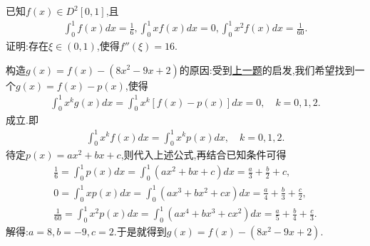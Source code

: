 \documentclass[lang=cn,newtx,10pt,scheme=chinese]{elegantbook}
\begin{document}
\begin{example}
   已知$f(x)\in D^2[0,1]$,且
   \begin{align*}
      \int_0^1{f\left( x \right) dx}=\frac{1}{6},\int_0^1{xf\left( x \right) dx}=0,\int_0^1{x^2f\left( x \right) dx}=\frac{1}{60}.
   \end{align*}
证明:存在$\xi \in (0,1)$,使得$f''(\xi)=16$.
\end{example}
\begin{note}
构造$g(x)=f(x)-(8x^2 - 9x + 2)$的原因:受到\hyperref[example245574]{上一题}的启发,我们希望找到一个$g(x)=f(x)-p(x)$,使得
\begin{align*}
   \int_0^1 x^k g(x)dx =\int_0^1 x^k [f(x)-p(x)]dx = 0, \quad k = 0,1,2.
\end{align*}
成立.即
\begin{align*}
   \int_0^1{x^kf(x)dx}=\int_0^1{x^kp(x)dx},\quad k=0,1,2.
\end{align*}
待定$p(x)=ax^2+bx+c$,则代入上述公式,再结合已知条件可得
\begin{gather*}
   \frac{1}{6}=\int_0^1{p(x)dx}=\int_0^1{\left( ax^2+bx+c \right) dx}=\frac{a}{3}+\frac{b}{2}+c,
\\
0=\int_0^1{xp(x)dx}=\int_0^1{\left( ax^3+bx^2+cx \right) dx}=\frac{a}{4}+\frac{b}{3}+\frac{c}{2},
\\
\frac{1}{60}=\int_0^1{x^2p(x)dx}=\int_0^1{\left( ax^4+bx^3+cx^2 \right) dx}=\frac{a}{5}+\frac{b}{4}+\frac{c}{3}.
\end{gather*}
解得:$a=8,b=-9,c=2$.于是就得到\(g(x)=f(x)-(8x^2 - 9x + 2)\).
\end{note}
\end{document}
